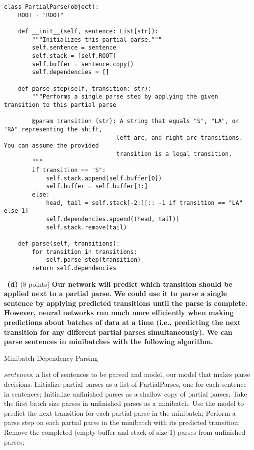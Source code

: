 \documentclass[a4 paper]{article}
\newcommand{\subproblem}[1]{~\newline\textbf{(#1)}}
\begin{document}
\begin{lstlisting}[label={list:first},caption=PartialParse class.]
class PartialParse(object):
    ROOT = "ROOT"

    def __init__(self, sentence: List[str]):
        """Initializes this partial parse."""
        self.sentence = sentence
        self.stack = [self.ROOT]
        self.buffer = sentence.copy()
        self.dependencies = []

    def parse_step(self, transition: str):
        """Performs a single parse step by applying the given transition to this partial parse

        @param transition (str): A string that equals "S", "LA", or "RA" representing the shift,
                                left-arc, and right-arc transitions. You can assume the provided
                                transition is a legal transition.
        """
        if transition == "S":
            self.stack.append(self.buffer[0])
            self.buffer = self.buffer[1:]
        else:
            head, tail = self.stack[-2:][:: -1 if transition == "LA" else 1]
            self.dependencies.append((head, tail))
            self.stack.remove(tail)

    def parse(self, transitions):
        for transition in transitions:
            self.parse_step(transition)
        return self.dependencies
\end{lstlisting}

\subproblem{d} (8 points) \textbf{Our network will predict which transition should be applied next to a partial parse. We could use it to parse a single sentence by applying predicted transitions until the parse is complete. However, neural networks run much more eﬃciently when making predictions about batches of data at a time (i.e., predicting the next transition for any diﬀerent partial parses simultaneously). We can parse sentences in minibatches with the following algorithm.}

\begin{algorithm}[h]
    \caption{Minibatch Dependency Parsing}
    \label{alg:framework}
    \begin{algorithmic}[1]
        \REQUIRE \textit{sentences}, a list of sentences to be parsed and model, our model that makes parse decisions.
        \STATE Initialize partial parses as a list of PartialParses, one for each sentence in sentences;
        \STATE Initialize unfinished parses as a shallow copy of partial parses;
        \STATE Take the ﬁrst batch size parses in unfinished parses as a minibatch;
        \STATE Use the model to predict the next transition for each partial parse in the minibatch;
        \STATE Perform a parse step on each partial parse in the minibatch with its predicted transition;
        \STATE Remove the completed (empty buffer and stack of size 1) parses from unfinished parses;
        \ENDWHILE
    \end{algorithmic}
\end{algorithm}
\end{document}
